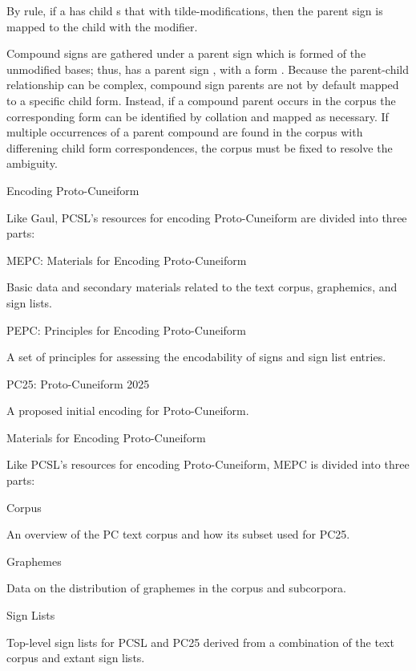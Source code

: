 \par By rule, if a  has child
      s that with
      tilde-modifications, then the parent sign is mapped to the child
      with the  modifier.


\par Compound signs are gathered under a parent sign which is
      formed of the unmodified bases; thus,  has a parent sign , with a form . Because the parent-child
      relationship can be complex, compound sign parents are not by
      default mapped to a specific child form.  Instead, if a compound
      parent occurs in the corpus the corresponding form can be
      identified by collation and mapped as necessary.  If multiple
      occurrences of a parent compound are found in the corpus with
      differening child form correspondences, the corpus must be fixed
      to resolve the ambiguity.

\Hh{}Encoding Proto-Cuneiform


\par Like Gaul, PCSL's resources for encoding Proto-Cuneiform are divided into three parts:

\Hdl\Hdt{}MEPC: Materials for Encoding Proto-Cuneiform

{}Basic data and secondary materials related to the text corpus, graphemics, and sign lists.

\Hdt{}PEPC: Principles for Encoding Proto-Cuneiform

{}A set of principles for assessing the encodability of signs and sign list entries.

\Hdt{}PC25: Proto-Cuneiform 2025

{}A proposed initial encoding for Proto-Cuneiform.

\Henddl
\Hh{}Materials for Encoding Proto-Cuneiform


\par Like PCSL's resources for encoding Proto-Cuneiform, MEPC is divided into three parts:

\Hdl\Hdt{}Corpus

{}An overview of the PC text corpus and how its subset used for PC25.

\Hdt{}Graphemes

{}Data on the distribution of graphemes in the corpus and subcorpora.

\Hdt{}Sign Lists

{}Top-level sign lists for PCSL and PC25 derived from a
	combination of the text corpus and extant sign lists.

